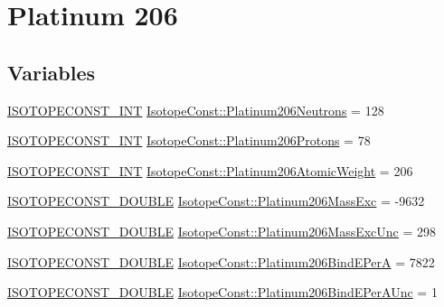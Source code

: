 \hypertarget{group___isotope_const-_platinum-_pt206}{}\section{Platinum 206}
\label{group___isotope_const-_platinum-_pt206}
\subsection*{Variables}
\begin{DoxyCompactItemize}
\item 
\mbox{\hyperlink{group___isotope_const-_macros_ga5f18360b3e99483a35c32d789e62621c}{I\+S\+O\+T\+O\+P\+E\+C\+O\+N\+S\+T\+\_\+\+I\+NT}} \mbox{\hyperlink{group___isotope_const-_platinum-_pt206_ga39e9ab7da255dbfc938ec09910815ee5}{Isotope\+Const\+::\+Platinum206\+Neutrons}} = 128
\item 
\mbox{\hyperlink{group___isotope_const-_macros_ga5f18360b3e99483a35c32d789e62621c}{I\+S\+O\+T\+O\+P\+E\+C\+O\+N\+S\+T\+\_\+\+I\+NT}} \mbox{\hyperlink{group___isotope_const-_platinum-_pt206_gadded7be060515dc6efa4d2dde48b43c3}{Isotope\+Const\+::\+Platinum206\+Protons}} = 78
\item 
\mbox{\hyperlink{group___isotope_const-_macros_ga5f18360b3e99483a35c32d789e62621c}{I\+S\+O\+T\+O\+P\+E\+C\+O\+N\+S\+T\+\_\+\+I\+NT}} \mbox{\hyperlink{group___isotope_const-_platinum-_pt206_ga48d95d13c49f70b7c8b0333ee6bb03b5}{Isotope\+Const\+::\+Platinum206\+Atomic\+Weight}} = 206
\item 
\mbox{\hyperlink{group___isotope_const-_macros_ga8f45a7272ce02c0b4c65c44636ed719a}{I\+S\+O\+T\+O\+P\+E\+C\+O\+N\+S\+T\+\_\+\+D\+O\+U\+B\+LE}} \mbox{\hyperlink{group___isotope_const-_platinum-_pt206_ga37bec9eaf202f3d1e3d76d12766b9ffb}{Isotope\+Const\+::\+Platinum206\+Mass\+Exc}} = -\/9632
\item 
\mbox{\hyperlink{group___isotope_const-_macros_ga8f45a7272ce02c0b4c65c44636ed719a}{I\+S\+O\+T\+O\+P\+E\+C\+O\+N\+S\+T\+\_\+\+D\+O\+U\+B\+LE}} \mbox{\hyperlink{group___isotope_const-_platinum-_pt206_ga97a11d8018edf5105cf885460727778b}{Isotope\+Const\+::\+Platinum206\+Mass\+Exc\+Unc}} = 298
\item 
\mbox{\hyperlink{group___isotope_const-_macros_ga8f45a7272ce02c0b4c65c44636ed719a}{I\+S\+O\+T\+O\+P\+E\+C\+O\+N\+S\+T\+\_\+\+D\+O\+U\+B\+LE}} \mbox{\hyperlink{group___isotope_const-_platinum-_pt206_ga10ac721dbac87691ef5f379df0d4a3e7}{Isotope\+Const\+::\+Platinum206\+Bind\+E\+PerA}} = 7822
\item 
\mbox{\hyperlink{group___isotope_const-_macros_ga8f45a7272ce02c0b4c65c44636ed719a}{I\+S\+O\+T\+O\+P\+E\+C\+O\+N\+S\+T\+\_\+\+D\+O\+U\+B\+LE}} \mbox{\hyperlink{group___isotope_const-_platinum-_pt206_ga77af2467300f084729f63b92d2879bb2}{Isotope\+Const\+::\+Platinum206\+Bind\+E\+Per\+A\+Unc}} = 1

\end{DoxyCompactItemize}
